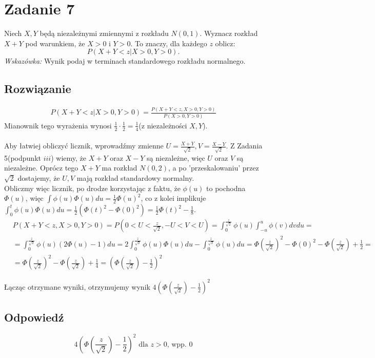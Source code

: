 \section{Zadanie 7}
Niech \(X,Y\) będą niezależnymi zmiennymi z rozkładu \(N(0,1)\). Wyznacz rozkład \(X+Y\) pod warunkiem, że \(X > 0\) i \(Y > 0\). To znaczy, dla każdego \(z\) oblicz:
\[
	P(X + Y < z | X > 0, Y > 0).
\]
\textit{Wskazówka:} Wynik podaj w terminach standardowego rozkładu normalnego.

\subsection*{Rozwiązanie}

\begin{align*}
	P(X + Y < z | X > 0, Y > 0) = \frac{P(X+Y<z, X>0, Y>0)}{P(X>0, Y>0)}
\end{align*}
Mianownik tego wyrażenia wynosi \( \frac{1}{2}\cdot \frac{1}{2}  =\frac{1}{4} \)(z niezależności \(X,Y\)). \\
\\
Aby łatwiej obliczyć licznik, wprowadźmy zmienne \(U = \frac{X+Y}{\sqrt{2}}, V=\frac{X-Y}{\sqrt{2}}\). Z Zadania 5(podpunkt \(iii\)) wiemy, że \(X+Y\) oraz \(X-Y\) są niezależne, więc \(U\) oraz \(V\) są niezależne. Oprócz tego \(X+Y\) ma rozkład \(N(0,2)\), a po 'przeskalowaniu' przez \(\sqrt{2}\) dostajemy, że \(U,V\) mają rozkład standardowy normalny.\\
Obliczmy więc licznik, po drodze korzystając z faktu, że \(\phi(u)\) to pochodna \(\Phi(u)\), więc \(\int \phi(u)\Phi(u) du = \frac{1}{2}\Phi(u)^2\), co z kolei implikuje \(\int_{0}^{t} \phi(u)\Phi(u) du = \frac{1}{2}(\Phi(t)^2 - \Phi(0)^2) = \frac{1}{2}\Phi(t)^2 - \frac{1}{8}\).
\begin{align*}
	 & P(X+Y<z, X>0, Y>0) = P(0<U<\frac{z}{\sqrt{2}}, -U<V<U) = \int_{0}^{\frac{z}{\sqrt{2}}} \phi(u) \int_{-u}^{u} \phi(v) dvdu =                           \\
	 & = \int_{0}^{\frac{z}{\sqrt{2}}} \phi(u) (2\Phi(u) - 1)du = 2\int_{0}^{\frac{z}{\sqrt{2}}}\phi(u)\Phi(u) du - \int_{0}^{\frac{z}{\sqrt{2}}}\phi(u)du =
	\Phi(\frac{z}{\sqrt{2}})^2 - \Phi(0)^2
	- \Phi(\frac{z}{\sqrt{2}})+\frac{1}{2} =                                                                                                                 \\&=
	\Phi(\frac{z}{\sqrt{2}})^2 - \Phi(\frac{z}{\sqrt{2}}) + \frac{1}{4} = (\Phi(\frac{z}{\sqrt{2}}) - \frac{1}{2})^2
\end{align*}

Łącząc otrzymane wyniki, otrzymujemy wynik \(4(\Phi(\frac{z}{\sqrt{2}}) - \frac{1}{2})^2\)
\subsection*{Odpowiedź}
\[
	\boxed{
		4(\Phi(\frac{z}{\sqrt{2}}) - \frac{1}{2})^2 \text{ dla } z > 0\text{, wpp. } 0
	}
\]
